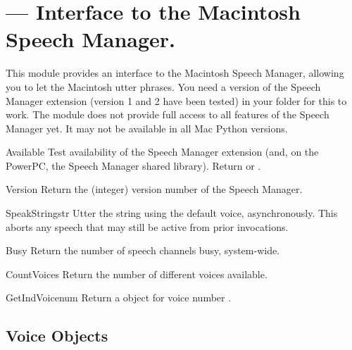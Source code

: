 \section{ ---
         Interface to the Macintosh Speech Manager.}




This module provides an interface to the Macintosh Speech Manager,
allowing you to let the Macintosh utter phrases. You need a version of
the Speech Manager extension (version 1 and 2 have been tested) in
your  folder for this to work. The module does not
provide full access to all features of the Speech Manager yet.  It may
not be available in all Mac Python versions.

\begin{funcdesc}{Available}{}
Test availability of the Speech Manager extension (and, on the
PowerPC, the Speech Manager shared library). Return  or
.
\end{funcdesc}

\begin{funcdesc}{Version}{}
Return the (integer) version number of the Speech Manager.
\end{funcdesc}

\begin{funcdesc}{SpeakString}{str}
Utter the string  using the default voice,
asynchronously. This aborts any speech that may still be active from
prior  invocations.
\end{funcdesc}

\begin{funcdesc}{Busy}{}
Return the number of speech channels busy, system-wide.
\end{funcdesc}

\begin{funcdesc}{CountVoices}{}
Return the number of different voices available.
\end{funcdesc}

\begin{funcdesc}{GetIndVoice}{num}
Return a  object for voice number .
\end{funcdesc}

\subsection{Voice Objects}
\label{voice-objects}

